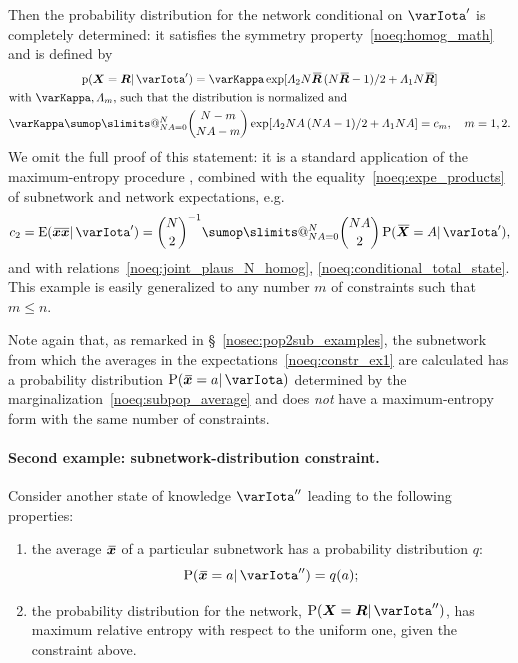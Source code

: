 \documentclass{article}
\makeatletter
\theoremstyle{remark}
\theoremstyle{innote}
\def\sum{\DOTSI\sumop\slimits@}
\newcommand*{\citep}{\parencites}
\renewcommand*{\|}{\mathpunct{|}}%
\renewcommand{\le}{\leqslant}%
\newcommand*{\pf}{\mathrm{p}}%
\newcommand*{\p}{\mathrm{P}}%
\newcommand*{\sect}{\S}%
\newcommand*{\eg}{{e.g.}}
\newcommand*{\E}{\mathrm{E}}
\DeclarePairedDelimiter\expp{(}{)}
\newcommand*{\expe}{\E\expp}%
\theoremstyle{simple}
\newcommand*{\widebar}[1]{{\mkern1.5mu\skew{2}\overline{\mkern-1.5mu#1\mkern-1.5mu}\mkern 1.5mu}}
\newcommand*{\av}{\widebar} %
\newcommand*{\sav}{\widebar} %
\newcommand*{\yxx}{x}%
\newcommand*{\yx}{\bm{\yxx}}%
\newcommand*{\yxs}{\sav{\yx}}%
\newcommand*{\yX}{\bm{X}}%
\newcommand*{\yXf}{\av{\yX}}%
\newcommand*{\yR}{\bm{R}}%
\newcommand*{\yRf}{\av{\yR}}%
\newcommand*{\yH}{\varIota}
\newcommand*{\yHa}{\varIota'}
\newcommand*{\yHb}{\varIota''}
\newcommand*{\yL}{\varLambda}
\makeatother
\begin{document}
\medskip Then the probability distribution for the network conditional on $\yHa$
is completely determined: it satisfies the symmetry
property~\eqref{noeq:homog_math} and is defined by
\begin{multline}
  \label{noeq:pop_distr_maxent1}
  \pf(\yX =\yR \|\yHa) =
\varKappa\exp[\yL_2 N\yRf\,(N\yRf-1)/2 + \yL_1 N\yRf]
\\
\!\begin{aligned}[b]
&\text{with $\varKappa, \yL_m$, such that the distribution is normalized and}
\\
&\varKappa\sum_{N A=0}^N %
\binom{N-m}{N A-m}
\exp[\yL_2 N A\,(N A-1)/2 + \yL_1 N A]
= c_m, \quad m=1,2.
\end{aligned}
\end{multline}
We omit the full proof of this statement: it is a standard application of
the maximum-entropy procedure
\citep[\eg:][]{jaynes1957,jaynes1963,good1963,jaynes1967,jaynes1979b,vancampenhoutetal1981,sivia1990,fangetal1997,bretthorst2013},
combined with the equality~\eqref{noeq:expe_products} of subnetwork and
network expectations, \eg
\begin{equation}
  \label{noeq:exploit_eq_expects}
  c_2 = \expe{\sav{\yx\yx}\|\yHa} = 
\binom{N}{2}^{-1}
\sum_{N A=0}^N %
\binom{N A}{2} \, \p(\yXf = A\|\yHa),
\end{equation}
and with relations~\eqref{noeq:joint_plaus_N_homog},
\eqref{noeq:conditional_total_state}. This example is easily generalized to
any number $m$ of constraints such that  $m\le n$.

Note again that, as remarked in \sect~\ref{nosec:pop2sub_examples}, the
subnetwork from which the averages in the
expectations~\eqref{noeq:constr_ex1} are calculated has a probability
distribution $\p(\yxs =a \|\yH)$ determined by the
marginalization~\eqref{noeq:subpop_average} and does \emph{not} have a
maximum-entropy form with the same number of constraints.


\paragraph{Second example: subnetwork-distribution constraint.}
\label{nosec:maxent_fullsubpop}
Consider another state of knowledge $\yHb$ leading to the following
properties:
\begin{enumerate}%
\item the average $\yxs$ of a particular
  subnetwork has a probability distribution $q$:
  \begin{equation}
    \label{noeq:constr_subpop_distr}
    \p(\yxs =a \|\yHb) = q(a);
  \end{equation}
\item the probability distribution for the network, $\p(\yX = \yR
  \|\yHb)$, has maximum relative entropy with respect to the uniform
  one, given the constraint above.
\end{enumerate}
\end{document}
